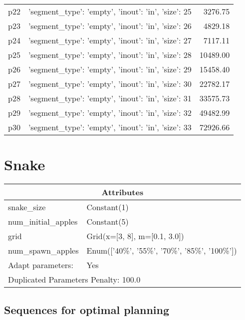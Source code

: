 \documentclass{article}
\begin{document}
\begin{center}
\begin{tabular}{@{}l|r|r@{}}
  p22&{'segment\_type': 'empty', 'inout': 'in', 'size': 25}&3276.75\\
  p23&{'segment\_type': 'empty', 'inout': 'in', 'size': 26}&4829.18\\
  p24&{'segment\_type': 'empty', 'inout': 'in', 'size': 27}&7117.11\\
  p25&{'segment\_type': 'empty', 'inout': 'in', 'size': 28}&10489.00\\
  p26&{'segment\_type': 'empty', 'inout': 'in', 'size': 29}&15458.40\\
  p27&{'segment\_type': 'empty', 'inout': 'in', 'size': 30}&22782.17\\
  p28&{'segment\_type': 'empty', 'inout': 'in', 'size': 31}&33575.73\\
  p29&{'segment\_type': 'empty', 'inout': 'in', 'size': 32}&49482.99\\
  p30&{'segment\_type': 'empty', 'inout': 'in', 'size': 33}&72926.66
                            \end{tabular}
                            \end{center}
                    
                            \newpage \section{Snake}
                    \begin{center}
                    \begin{tabular}{@{}p{}p{}@{}}
                    \multicolumn{2}{c}{\bf \large Attributes}\\\midrule
                    snake\_size & Constant(1)\\
num\_initial\_apples & Constant(5)\\
grid & Grid(x=[3, 8], m=[0.1, 3.0])\\
num\_spawn\_apples & Enum(['40\%', '55\%', '70\%', '85\%', '100\%'])
                    \\\midrule
                    Adapt parameters: & Yes \\\midrule
                    \multicolumn{2}{l}{Duplicated Parameters Penalty: 100.0}
                    \end{tabular}
                    \end{center}
                
                            \subsection*{Sequences for optimal planning}
\end{document}
